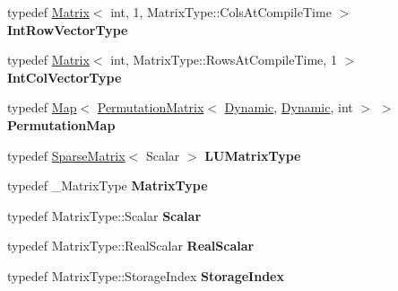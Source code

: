 \begin{DoxyCompactItemize}
typedef \hyperlink{group___core___module_class_eigen_1_1_matrix}{Matrix}$<$ int, 1, Matrix\+Type\+::\+Cols\+At\+Compile\+Time $>$ {\bfseries Int\+Row\+Vector\+Type}
\item 
\mbox{\label{class_eigen_1_1_super_l_u_base_a4437863f63481a5a8cc9ae8a5566922b}} 
typedef \hyperlink{group___core___module_class_eigen_1_1_matrix}{Matrix}$<$ int, Matrix\+Type\+::\+Rows\+At\+Compile\+Time, 1 $>$ {\bfseries Int\+Col\+Vector\+Type}
\item 
\mbox{\label{class_eigen_1_1_super_l_u_base_ac9c65a00757d1aec9655e3c89fe1a2a0}} 
typedef \hyperlink{group___core___module_class_eigen_1_1_map}{Map}$<$ \hyperlink{group___core___module_class_eigen_1_1_permutation_matrix}{Permutation\+Matrix}$<$ \hyperlink{namespace_eigen_ad81fa7195215a0ce30017dfac309f0b2}{Dynamic}, \hyperlink{namespace_eigen_ad81fa7195215a0ce30017dfac309f0b2}{Dynamic}, int $>$ $>$ {\bfseries Permutation\+Map}
\item 
\mbox{\label{class_eigen_1_1_super_l_u_base_a2a4f84d7bee23175a75b4934bb4c1f68}} 
typedef \hyperlink{group___sparse_core___module_class_eigen_1_1_sparse_matrix}{Sparse\+Matrix}$<$ Scalar $>$ {\bfseries L\+U\+Matrix\+Type}
\item 
\mbox{\label{class_eigen_1_1_super_l_u_base_a41cb4cb4e8a548b9112c3f3cdba4782e}} 
typedef \+\_\+\+Matrix\+Type {\bfseries Matrix\+Type}
\item 
\mbox{\label{class_eigen_1_1_super_l_u_base_a4d2c46083f0f2167e36a02de2e7fd4d1}} 
typedef Matrix\+Type\+::\+Scalar {\bfseries Scalar}
\item 
\mbox{\label{class_eigen_1_1_super_l_u_base_ad8e16b5721aa493c0093862f58d3de0e}} 
typedef Matrix\+Type\+::\+Real\+Scalar {\bfseries Real\+Scalar}
\item 
\mbox{\label{class_eigen_1_1_super_l_u_base_a2b9a744f9d881b6c98dc3c975da11e2f}} 
typedef Matrix\+Type\+::\+Storage\+Index {\bfseries Storage\+Index}
\item 
\mbox{\label{class_eigen_1_1_super_l_u_base_a0b9fae173ef6689999ae774c8c2707f7}} 

\end{DoxyCompactItemize}
